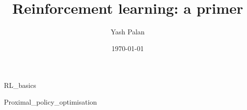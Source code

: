 \documentclass{book}
\title{Reinforcement learning: a primer}
\author{Yash Palan}
\date{\today}
\begin{document}
\maketitle

{RL_basics}

{Proximal_policy_optimisation}

\printbibliography
\end{document}
